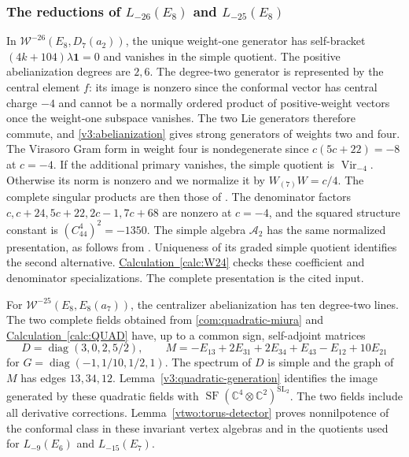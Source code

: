 \documentclass[11pt,a4paper]{amsart}
\numberwithin{equation}{section}
\theoremstyle{definition}
\theoremstyle{remark}
\newcommand{\C}{\mathbb C}
\newcommand{\SF}{\operatorname{SF}}
\newcommand{\Vir}{\operatorname{Vir}}
\begin{document}
\subsubsection{\texorpdfstring{The reductions of $L_{-26}(E_8)$ and $L_{-25}(E_8)$}{The reductions of L-26(E8) and L-25(E8)}}
In $\mathcal W^{-26}(E_8,D_7(a_2))$, the unique weight-one generator has self-bracket
$(4k+104)\lambda\mathbf1=0$ and vanishes in the simple quotient. The positive abelianization degrees are $2,6$.
The degree-two generator is represented by the central element $f$:
its image is nonzero since the conformal vector has central charge $-4$ and cannot be
a normally ordered product of positive-weight vectors once the
weight-one subspace vanishes. The two Lie generators
therefore commute, and \cref{v3:abelianization} gives strong generators
of weights two and four. The Virasoro Gram form in weight four is
nondegenerate since $c(5c+22)=-8$ at $c=-4$. If the additional primary
vanishes, the simple quotient is $\Vir_{-4}$. Otherwise its norm is
nonzero and we normalize it by $W_{(7)}W=c/4$. The complete singular
products are then those of \cite[\S5.2.2, equations~(5.10)--(5.13)]{BSW}.
The denominator factors $c,c+24,5c+22,2c-1,7c+68$ are nonzero at $c=-4$,
and the squared structure constant is $(C_{44}^4)^2=-1350$. The simple algebra $\mathcal A_2$ has the
same normalized presentation, as follows from \cite[Theorem~3.9]{CLSF}.
Uniqueness of its graded simple quotient identifies the second alternative.
\hyperref[calc:W24]{Calculation~\ref*{calc:W24}} checks these coefficient
and denominator specializations. The complete presentation is the cited input.

For $\mathcal W^{-25}(E_8,E_8(a_7))$, the centralizer abelianization has ten degree-two lines.
The two complete fields obtained from \cref{com:quadratic-miura} and
\hyperref[calc:QUAD]{Calculation~\ref*{calc:QUAD}} have,
up to a common sign, self-adjoint matrices
$$
 D=\operatorname{diag}(3,0,2,5/2),\qquad
 M=-E_{13}+2E_{31}+2E_{34}+E_{43}-E_{12}+10E_{21}
$$
for $G=\operatorname{diag}(-1,1/10,1/2,1)$. The spectrum of $D$ is
simple and the graph of $M$ has edges $13,34,12$. Lemma~\ref{v3:quadratic-generation} identifies the image generated
by these quadratic fields with
$\SF(\C^4\otimes\C^2)^{\mathrm{SL}_2}$. The two fields include all derivative corrections.
Lemma~\ref{vtwo:torus-detector} proves nonnilpotence of the conformal class in these invariant
vertex algebras and in the quotients used for $L_{-9}(E_6)$ and $L_{-15}(E_7)$.
\end{document}
